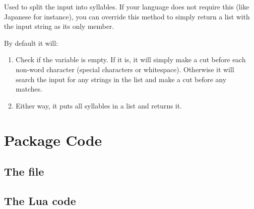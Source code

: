 \documentclass{ltxdockit}
\begin{document}
Used to split the input into syllables. If your language does not require this
(like Japanese for instance), you can override this method to simply return a
list with the input string as its only member.

By default it will:

\begin{enumerate}
  \item Check if the  variable is empty. If
    it is, it will simply make a cut before each non-word character (special
    characters or whitespace). Otherwise it will search the input for any
    strings in the list and make a cut before any matches.
  \item Either way, it puts all syllables in a list and returns it.
\end{enumerate}

\section{Package Code}

\subsection{The  file}

\subsection{The Lua code}
\end{document}
